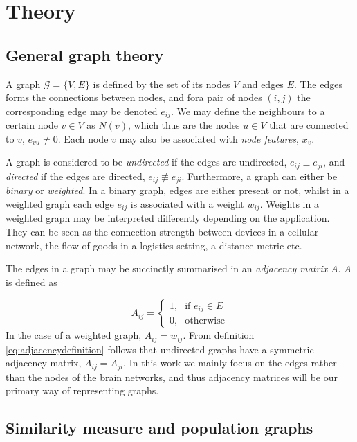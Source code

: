 \chapter{Theory}

\section{General graph theory}

A graph $\mathcal{G} = \{V, E \} $ is defined by the set of its nodes $V$ and edges $E$. The edges forms the connections between nodes, and fora pair of nodes $(i,j)$ the corresponding edge may be denoted $e_{ij}$. We may define the neighbours to a certain node $v \in V$ as $N(v)$, which thus are the nodes $u \in V$ that are connected to $v$, $e_{vu} \neq 0$. Each node $v$ may also be associated with \textit{node features}, $x_v$.

A graph is considered to be \textit{undirected} if the edges are undirected, $e_{ij} \equiv e_{ji}$, and \textit{directed} if the edges are directed, $e_{ij} \not\equiv e_{ji}$. Furthermore, a graph can either be \textit{binary} or \textit{weighted}. In a binary graph, edges are either present or not, whilst in a weighted graph each edge $e_{ij}$ is associated with a weight $w_{ij}$. \cite{source} Weights in a weighted graph may be interpreted differently depending on the application. They can be seen as the connection strength between devices in a cellular network, the flow of goods in a logistics setting, a distance metric etc.

The edges in a graph may be succinctly summarised in an \textit{adjacency matrix} $A$. $A$ is defined as

\begin{equation}
    A_{ij} = \begin{cases} \mbox{1,} & \mbox{if } e_{ij} \in E \\ \mbox{0,} & \mbox{otherwise} \end{cases}
    \label{eq:adjacencydefinition}
\end{equation}
In the case of a weighted graph, $A_{ij} = w_{ij}$. From definition \eqref{eq:adjacencydefinition} follows that undirected graphs have a symmetric adjacency matrix, $A_{ij} = A_{ji}$. In this work we mainly focus on the edges rather than the nodes of the brain networks, and thus adjacency matrices will be our primary way of representing graphs.

\section{Similarity measure and population graphs}

